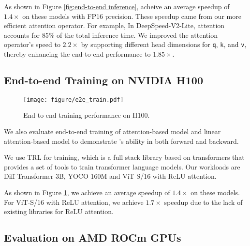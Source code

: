  As shown in Figure \ref{fig:end-to-end inference}, \oursys{} acheive an average speedup of $1.4\times$ on these models with FP16 precision. These speedup came from our more efficient attention operator. For example, In DeepSpeed-V2-Lite, attention accounts for $85\%$ of the total inference time. We improved the attention operator's speed to $2.2\times$ by supporting different head dimensions for \texttt{q}, \texttt{k}, and \texttt{v}, thereby enhancing the end-to-end performance to $1.85\times$.


\subsection{End-to-end Training on NVIDIA H100}

\begin{figure}[t]
    \centering
    \texttt{[image: figure/e2e\_train.pdf]}
    \vspace{-5mm}
    \caption{End-to-end training performance on H100.}
    \vspace{-5mm}
    \label{fig:end-to-end-train}
\end{figure}

We also evaluate end-to-end training of attention-based model and linear attention-based model to demonstrate \oursys{}'s ability in both forward and backward.

 We use TRL\cite{vonwerra2022trl} for training, which is a full stack library based on transformers that provides a set of tools to train transformer language models. Our workloads are Diff-Transformer-3B, YOCO-160M and ViT-S/16 with ReLU attention.

 As shown in Figure \ref{fig:end-to-end-train}, we achieve an average speedup of $1.4\times$ on these models. For ViT-S/16 with ReLU attention, we achieve $1.7\times$ speedup due to the lack of existing libraries for ReLU attention.

\vspace{-2mm}
\subsection{Evaluation on AMD ROCm GPUs}
\vspace{-2mm}

